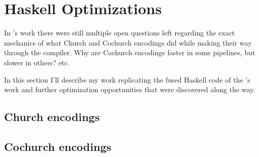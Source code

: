 
\section{Haskell Optimizations}
In \cite{Harper2011}'s work there were still multiple open questions left regarding the exact mechanics of what Church and Cochurch encodings did while making their way through the compiler. Why are Cochurch encodings faster in some pipelines, but slower in others? etc.

In this section I'll describe my work replicating the fused Haskell code of the \cite{Harper2011}'s work and further optimization opportunities that were discovered along the way.

\subsection{Church encodings}
\subsection{Cochurch encodings}



\iffalse
One question that comes up is: Yes this fusion is nice, but how does the fused code actually provide a speedup, isn't the language already lazy and therefore not ripe for such a speedup? What are Haskell's other optimizations that come into play that pushes the shortcut fusion over the finish as a fast optimization?
\fi




